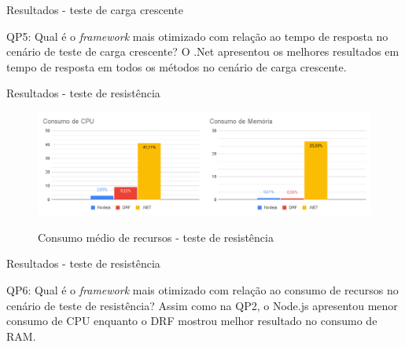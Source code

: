 \documentclass{libs/ufc_format}
\begin{document}
\begin{frame}{Resultados - teste de carga crescente}
    \begin{block}{QP5: Qual é o \textit{framework} mais otimizado com relação ao tempo de resposta no cenário de teste de carga crescente?}
        O .Net apresentou os melhores resultados em tempo de resposta em todos os métodos no cenário de carga crescente.
    \end{block}
\end{frame}


\begin{frame}{Resultados - teste de resistência}
    \begin{figure}[H]
        \centering
        \caption{Consumo médio de recursos - teste de resistência}
        \includegraphics[width=1\linewidth]{figuras/resultados/consumo-recursos-resistencia.pdf}
        \captionsetup{justification=centering}
        \label{fig:recursos-resistencia}
    \end{figure}
\end{frame}

\begin{frame}{Resultados - teste de resistência}
    \begin{block}{QP6: Qual é o \textit{framework} mais otimizado com relação ao consumo de recursos no cenário de teste de resistência?}
        Assim como na QP2, o Node.js apresentou menor consumo de CPU enquanto o DRF mostrou melhor resultado no consumo de RAM.
    \end{block}
\end{frame}
\end{document}

